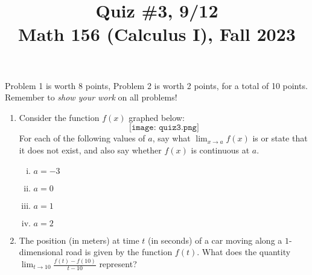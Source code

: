 \documentclass[11pt]{article}
\title{Quiz \#3, 9/12 \\ Math 156 (Calculus I), Fall 2023}
\date{}
\begin{document}
\maketitle

\thispagestyle{empty}

\vspace{-2cm}

Problem 1 is worth 8 points, Problem 2 is worth 2 points, for a total of 10 points. Remember to \emph{show your work} on all problems!

\begin{enumerate}
\item Consider the function $f(x)$ graphed below:
\[ \texttt{[image: quiz3.png]}\]
For each of the following values of $a$, say what $\displaystyle \lim_{x \to a} f(x)$ is or state that it does not exist, and also say whether $f(x)$ is continuous at $a$.
\begin{multicols}{2}
\begin{enumerate}[(i)]
\item $a=-3$
\item $a=0$
\item $a=1$
\item $a=2$
\end{enumerate}
\end{multicols}

\vspace{5cm}

\item The position (in meters) at time $t$ (in seconds) of a car moving along a $1$-dimensional road is given by the function $f(t)$. What does the quantity $\displaystyle \lim_{t \to 10} \frac{f(t) - f(10)}{t-10}$ represent?

\end{enumerate}
\end{document}
